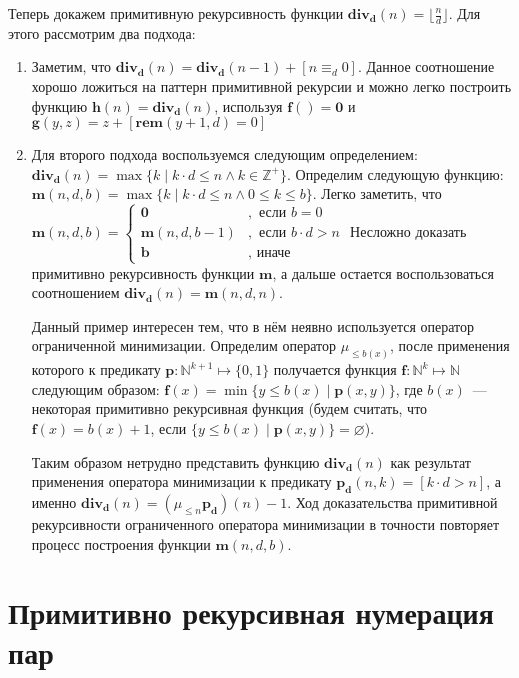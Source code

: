 \documentclass[
    11pt,
    a4paper
]{article}
\renewcommand{\emptyset}{\varnothing}
\theoremstyle{definition}
\begin{document}
Теперь докажем примитивную рекурсивность функции $\mathbf{div_d}(n) = \lfloor \frac{n}{d} \rfloor$. Для этого рассмотрим два подхода:
\begin{enumerate}
\item Заметим, что $\mathbf{div_d}(n) = \mathbf{div_d}(n - 1) + [n \equiv_d 0]$. Данное соотношение хорошо ложиться на паттерн примитивной рекурсии и можно легко построить функцию $\mathbf{h}(n) = \mathbf{div_d}(n)$, используя $\mathbf{f}() = \mathbf{0}$ и $\mathbf{g}(y, z) = z + [\mathbf{rem}(y + 1, d) = 0]$
\item Для второго подхода воспользуемся следующим определением: $\mathbf{div_d}(n) = \max \{ k \mid k \cdot d \leq n \wedge k \in \mathbb{Z^+} \}$. Определим следующую функцию: $\mathbf{m}(n, d, b) = \max \{ k \mid k \cdot d \leq n \wedge 0 \leq k \leq b \}$. Легко заметить, что $\mathbf{m}(n, d, b) = \begin{cases}
\mathbf{0} &, \text{ если } b = 0\\
\mathbf{m}(n, d, b - 1) &, \text{ если } b \cdot d > n\\
\mathbf{b} &, \text{ иначе} 
\end{cases}$
Несложно доказать примитивно рекурсивность функции $\mathbf{m}$, а дальше остается воспользоваться соотношением $\mathbf{div_d}(n) = \mathbf{m}(n, d, n)$.

Данный пример интересен тем, что в нём неявно используется оператор ограниченной минимизации. Определим оператор $\mu_{\leq b(x)}$, после применения которого к предикату $\mathbf{p}: \mathbb{N}^{k+1} \mapsto \{0, 1\}$ получается функция $\mathbf{f}: \mathbb{N}^k \mapsto \mathbb{N}$ следующим образом: $\mathbf{f}(x) = \min\{y \leq b(x) \mid \mathbf{p}(x, y)\}$, где $b(x)$~--- некоторая примитивно рекурсивная функция (будем считать, что $\mathbf{f}(x) = b(x) + 1$, если $\{y \leq b(x) \mid \mathbf{p}(x, y)\} = \emptyset$).

Таким образом нетрудно представить функцию $\mathbf{div_d}(n)$ как результат применения оператора минимизации к предикату $\mathbf{p_d}(n, k) = [k \cdot d > n]$, а именно $\mathbf{div_d}(n) = (\mu_{\leq n} \mathbf{p_d})(n) - 1$. Ход доказательства примитивной рекурсивности ограниченного оператора минимизации в точности повторяет процесс построения функции $\mathbf{m}(n, d, b)$.
\end{enumerate}

\section{Примитивно рекурсивная нумерация пар}
\end{document}
